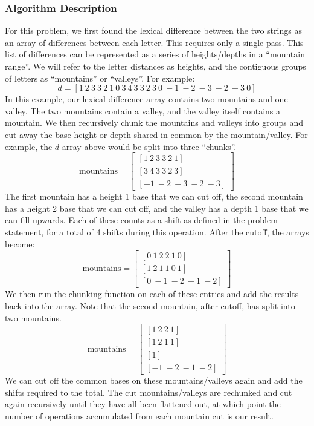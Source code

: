 \documentclass{math}
\begin{document}
\subsubsection*{Algorithm Description}
For this problem, we first found the lexical difference between the two strings
as an array of differences between each letter. This requires only a single
pass. This list of differences can be represented as a series of
heights/depths in a ``mountain range''. We will refer to the letter distances
as heights, and the contiguous groups of letters as ``mountains'' or
``valleys''. For example:
\[ d = [1\ 2\ 3\ 3\ 2\ 1\ 0\ 3\ 4\ 3\ 3\ 2\ 3\ 0\ -1\ -2\ -3\ -2\ -3\ 0] \]
In this example, our lexical difference array contains two mountains and one
valley. The two mountains contain a valley, and the valley itself contains a
mountain. We then recursively chunk the mountains and valleys into groups and
cut away the base height or depth shared in common by the mountain/valley.
For example, the \( d \) array above would be split into three ``chunks''.
\[ \text{mountains} = \begin{bmatrix}
  [1\ 2\ 3\ 3\ 2\ 1] \\
  [3\ 4\ 3\ 3\ 2\ 3] \\
  [-1\ -2\ -3\ -2\ -3]
\end{bmatrix} \]
The first mountain has a height 1 base that we can cut off, the second mountain
has a height 2 base that we can cut off, and the valley has a depth 1 base that
we can fill upwards. Each of these counts as a shift as defined in the problem
statement, for a total of 4 shifts during this operation. After the cutoff,
the arrays become:
\[ \text{mountains} = \begin{bmatrix}
  [0\ 1\ 2\ 2\ 1\ 0] \\
  [1\ 2\ 1\ 1\ 0\ 1] \\
  [0\ -1\ -2\ -1\ -2]
\end{bmatrix} \]
We then run the chunking function on each of these entries and add the results
back into the array. Note that the second mountain, after cutoff, has split into
two mountains.
\[ \text{mountains} = \begin{bmatrix}
  [1\ 2\ 2\ 1] \\
  [1\ 2\ 1\ 1] \\
  [1] \\
  [-1\ -2\ -1\ -2]
\end{bmatrix} \]
We can cut off the common bases on these mountains/valleys again and add the
shifts required to the total. The cut mountains/valleys are rechunked and cut
again recursively until they have all been flattened out, at which point the
number of operations accumulated from each mountain cut is our result.
\end{document}
